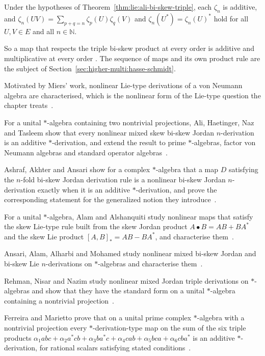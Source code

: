 \begin{lemma}\label{lem:lie:ali-bi-skew-additive}
Under the hypotheses of Theorem~\ref{thm:lie:ali-bi-skew-triple}, each
$\zeta_{n}$ is additive, and
$\zeta_{n}(UV)=\sum_{p+q=n}\zeta_{p}(U)\zeta_{q}(V)$ and
$\zeta_{n}(U^{*})=\zeta_{n}(U)^{*}$ hold for all $U,V\in E$ and all $n\in\mathbb{N}$.
\end{lemma}

So a map that respects the triple bi-skew product at every order is additive and
multiplicative at every order \cite[p.~136]{AliAliTasleem2026}. The sequence of
maps and its own product rule are the subject of
Section~\ref{sec:higher-multi:hasse-schmidt}.

Motivated by Miers' work, nonlinear Lie-type derivations of a von Neumann algebra are characterised, which is the nonlinear form of the Lie-type question the chapter treats~\cite{WlNonlinearLieTypeDerivationsOfV2013}.

For a unital $*$-algebra containing two nontrivial projections, Ali, Haetinger, Naz and Tasleem show that every nonlinear mixed skew bi-skew Jordan $n$-derivation is an additive $*$-derivation, and extend the result to prime $*$-algebras, factor von Neumann algebras and standard operator algebras~\cite{WlNonlinearMixedSkewBiSkewJordan2026}.

Ashraf, Akhter and Ansari show for a complex $*$-algebra that a map $D$ satisfying the $n$-fold bi-skew Jordan derivation rule is a nonlinear bi-skew Jordan $n$-derivation exactly when it is an additive $*$-derivation, and prove the corresponding statement for the generalized notion they introduce~\cite{WlNonlinearGeneralizedBiSkewJord2024}.

For a unital $*$-algebra, Alam and Alshanquiti study nonlinear maps that satisfy the skew Lie-type rule built from the skew Jordan product $A\bullet B=AB+BA^*$ and the skew Lie product $[A,B]_*=AB-BA^*$, and characterise them~\cite{WlNonlinearMixedSkewLieTypeDeriv2026}.

Ansari, Alam, Alharbi and Mohamed study nonlinear mixed bi-skew Jordan and bi-skew Lie $n$-derivations on $*$-algebras and characterise them~\cite{WlANoteOnNonlinearMixedBiSkewJor2026}.

Rehman, Nisar and Nazim study nonlinear mixed Jordan triple derivations on $*$-algebras and show that they have the standard form on a unital $*$-algebra containing a nontrivial projection~\cite{WlANoteOnNonlinearMixedJordanTri2022}.

Ferreira and Marietto prove that on a unital prime complex $*$-algebra with a nontrivial projection every $*$-derivation-type map on the sum of the six triple products $\alpha_1abc+\alpha_2a^*cb+\alpha_3ba^*c+\alpha_4cab+\alpha_5bca+\alpha_6cba^*$ is an additive $*$-derivation, for rational scalars satisfying stated conditions~\cite{WlNonlinearMapsOfDerivationTypeO2023}.
